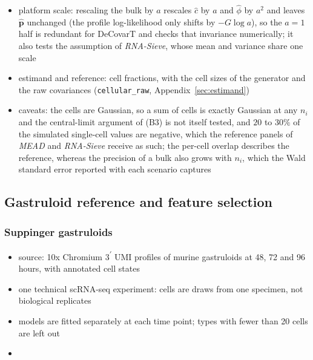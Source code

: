 \documentclass[pdflatex, sn-nature]{sn-jnl}
\theoremstyle{thmstyleone}%
\theoremstyle{thmstyletwo}%
\theoremstyle{thmstylethree}%
\begin{document}
\begin{itemize}
\begin{itemize}
    \item cell sizes: equal, or lineage 3--4 five times larger, \(\boldsymbol{S}=(1,1,5,5)\)
    \item genes: \(G=20\) or \(200\); the maximum-likelihood \(\hat\phi\) is biased down by about \((G-J)/G\), \(0.8\)
          and \(0.98\) here
  \end{itemize}
  \item platform scale: rescaling the bulk by \(a\) rescales \(\hat c\) by \(a\) and \(\hat\phi\) by \(a^{2}\) and leaves
        \(\hat{\boldsymbol{p}}\) unchanged (the profile log-likelihood only shifts by \(-G\log a\)), so the \(a=1\) half
        is redundant for DeCovarT and checks that invariance numerically; it also tests the assumption of
        \emph{RNA-Sieve}, whose mean and variance share one scale
  \item estimand and reference: cell fractions, with the cell sizes of the generator and the raw covariances
        (\texttt{cellular\_raw}, Appendix~\ref{sec:estimand})
  \item caveats: the cells are Gaussian, so a sum of cells is exactly Gaussian at any \(n_{i}\) and the central-limit
        argument of (B3) is not itself tested, and \(20\) to \(30\%\) of the simulated single-cell values are negative,
        which the reference panels of \emph{MEAD} and \emph{RNA-Sieve} receive as such; the per-cell overlap describes
        the reference, whereas the precision of a bulk also grows with \(n_{i}\), which the Wald standard error reported
        with each scenario captures
\end{itemize}

\subsection{Gastruloid reference and feature selection}
\label{sec:alignment}

\subsubsection{Suppinger gastruloids}
\label{sec:suppinger}

\begin{itemize}
  \item source: 10x Chromium 3\textsuperscript{\(\prime\)} UMI profiles of murine gastruloids at 48, 72 and
        96 hours, with annotated cell states \cite{suppingerMultimodalCharacterizationMurine2023}
  \item one technical scRNA-seq experiment: cells are draws from one specimen, not biological
        replicates \cite{zimmermanPracticalSolutionPseudoreplication2021,squairConfrontingFalseDiscoveries2021}
  \item models are fitted separately at each time point; types with fewer than 20 cells are left out
  \item[] 
\end{itemize}
\end{document}
